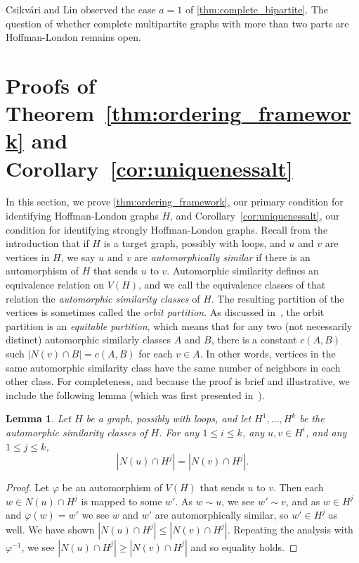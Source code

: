 \documentclass[11pt]{article}
\newtheorem{lemma}[theorem]{Lemma}
\theoremstyle{definition}
\begin{document}
Csikv\'ari and Lin \cite{CsikvariLin2015} observed the case $a=1$ of \cref{thm:complete_bipartite}. The question of whether complete multipartite graphs with more than two parts are Hoffman-London remains open.

\section{Proofs of Theorem~\ref{thm:ordering_framework} and Corollary~\ref{cor:uniquenessalt}} \label{sec:main_theorem_proofs}

In this section, we prove \cref{thm:ordering_framework}, our primary condition for identifying Hoffman-London graphs $H$, and Corollary~\ref{cor:uniquenessalt}, our condition for identifying strongly Hoffman-London graphs. Recall from the introduction that if $H$ is a target graph, possibly with loops, and $u$ and $v$ are vertices in $H$, we say $u$ and $v$ are \emph{automorphically similar} if there is an automorphism of $H$ that sends $u$ to $v$. Automorphic similarity defines an equivalence relation on $V(H)$, and we call the equivalence classes of that relation the \emph{automorphic similarity classes} of $H$. The resulting partition of the vertices is sometimes called the \emph{orbit partition}. As discussed in~\cite[Section 9.3]{GodsilRoyle2001}, the orbit partition is an \emph{equitable partition}, which means that for any two (not necessarily distinct) automorphic similarly classes $A$ and $B$, there is a constant $c(A,B)$ such $|N(v) \cap B| = c(A,B)$ for each $v \in A$. In other words, vertices in the same automorphic similarity class have the same number of neighbors in each other class. For completeness, and because the proof is brief and illustrative, we include the following lemma (which was first presented in~\cite{GalvinMcMillonNirRedlich2025}).

\begin{lemma}\label{lem:auto_sim_nbrs}
Let $H$ be a graph, possibly with loops, and let $H^1, \ldots, H^k$ be the automorphic similarity classes of $H$. For any $1 \le i \le k$, any $u,v \in H^i$, and any $1 \le j \le k$,
\[ |N(u) \cap H^j| = |N(v) \cap H^j|.\]
\end{lemma}

\begin{proof}
Let $\varphi$ be an automorphism of $V(H)$ that sends $u$ to $v$. Then each $w \in N(u) \cap H^j$ is mapped to some $w'$. As $w \sim u$, we see $w' \sim v$, and as $w \in H^j$ and $\varphi(w) = w'$ we see $w$ and $w'$ are automorphically similar, so $w' \in H^j$ as well. We have shown $|N(u) \cap H^j| \le |N(v) \cap H^j|$. Repeating the analysis with $\varphi^{-1}$, we see $|N(u) \cap H^j| \ge |N(v) \cap H^j|$ and so equality holds.
\end{proof}
\end{document}
